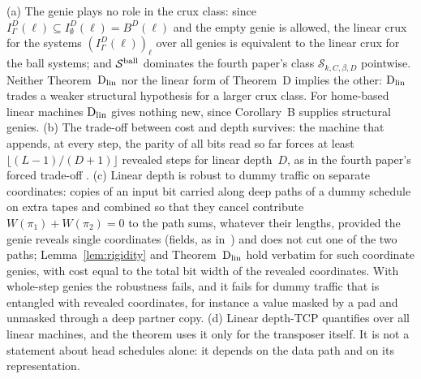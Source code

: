 \begin{remark}[Scope]\label{rem:Dlin-scope}
(a) The genie plays no role in the crux class: since $I^D_\Gamma(\ell)\subseteq I^D_\emptyset(\ell)=B^D(\ell)$ and the empty
genie is allowed, the linear crux for the systems $(I^D_\Gamma(\ell))_\ell$ over all genies is equivalent to the linear crux
for the ball systems; and $\mathcal S^{\mathrm{ball}}$ dominates the fourth paper's class $\mathcal S_{k,C,\beta,D}$ pointwise. Neither
Theorem~$\mathrm{D}_{\mathrm{lin}}$ nor the linear form of Theorem~D implies the other: $\mathrm{D}_{\mathrm{lin}}$ trades a weaker structural hypothesis for a larger
crux class. For home-based linear machines $\mathrm{D}_{\mathrm{lin}}$ gives nothing new, since Corollary~B supplies structural genies.
(b) The trade-off between cost and depth survives: the machine that appends, at every step, the parity of all bits read so
far forces at least $\lfloor(L-1)/(D+1)\rfloor$ revealed steps for linear depth~$D$, as in the fourth paper's forced trade-off
\cite[Proposition~4.13]{FourthPaper2026}.
(c) Linear depth is robust to dummy traffic on separate coordinates: copies of an input bit carried along deep paths of a
dummy schedule on extra tapes and combined so that they cancel contribute $W(\pi_1)+W(\pi_2)=0$ to the path sums, whatever their
lengths, provided the genie reveals single coordinates (fields, as in~\cite[Remark~4.6]{FourthPaper2026}) and does not cut one
of the two paths; Lemma~\ref{lem:rigidity} and Theorem~$\mathrm{D}_{\mathrm{lin}}$ hold verbatim for such coordinate genies, with cost equal to the
total bit width of the revealed coordinates. With whole-step genies the robustness fails, and it fails for dummy traffic that is
entangled with revealed coordinates, for instance a value masked by a pad and unmasked through a deep partner copy.
(d) Linear depth-TCP quantifies over all linear machines, and the theorem uses it only for the transposer itself. It is not a
statement about head schedules alone: it depends on the data path and on its representation.
\end{remark}
